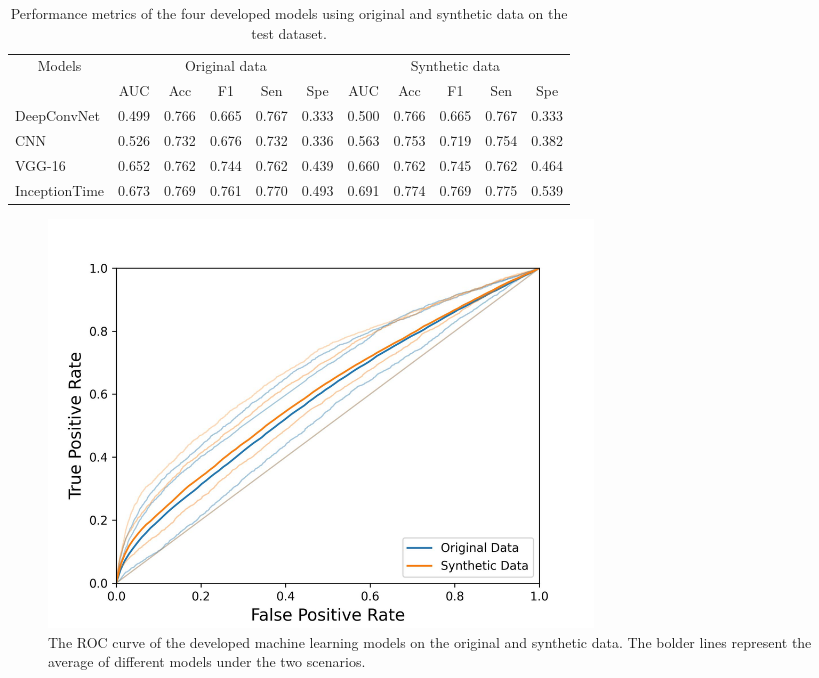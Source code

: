 \documentclass{article}
\begin{document}
\begin{table}[]
\centering
\caption{Performance metrics of the four developed models using original and synthetic data on the test dataset.}
\label{tab:PF}
\begin{tabular}{|l|c|c|c|c|c|c|c|c|c|c|} 
\hline
\multicolumn{1}{|c|}{\multirow{2}{*}{Models}} & \multicolumn{5}{c|}{Original data} & \multicolumn{5}{c|}{Synthetic data} \\ \cline{2-11} 
\multicolumn{1}{|c|}{}                        & AUC  & Acc  & F1 & Sen & Spe & AUC   & Acc   & F1   & Sen  & Spe  \\ \hline
DeepConvNet                                          &0.499      &0.766       &0.665    &0.767     &0.333     &0.500       &0.766        &0.665      &0.767      &0.333      \\ \hline
CNN                                &      0.526&       0.732&    0.676&     0.732&     0.336&       0.563&        0.753&      0.719&      0.754& 0.382      \\ \hline
VGG-16                                        & 0.652      &0.762       &0.744    &0.762     &0.439     &0.660       &0.762        &0.745      &0.762      &0.464      \\ \hline
InceptionTime                                   & 0.673      &0.769       &0.761    &0.770     &0.493     &0.691       &0.774        &0.769      &0.775      &0.539 \\ \hline

\end{tabular}
\end{table}


\begin{figure}
\centering
    \includegraphics[width=0.7\textwidth]{Documents/ROC.jpg}
    \caption{The ROC curve of the developed machine learning models on the original and synthetic data. The bolder lines represent the average of different models under the two scenarios.}
    \label{fig:ROC}

\end{figure}
\end{document}
